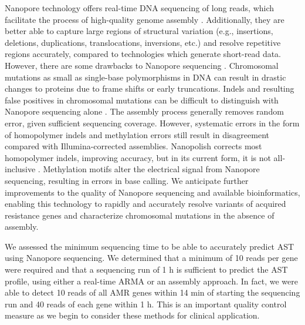Nanopore technology offers real-time DNA sequencing of long reads, which facilitate the process of high-quality genome assembly \citep{Lu2016-ru}. Additionally, they are better able to capture large regions of structural variation (e.g., insertions, deletions, duplications, translocations, inversions, etc.) and resolve repetitive regions accurately, compared to technologies which generate short-read data. However, there are some drawbacks to Nanopore sequencing \citep{Lu2016-ru}. Chromosomal mutations as small as single-base polymorphisms in DNA can result in drastic changes to proteins due to frame shifts or early truncations. Indels and resulting false positives in chromosomal mutations can be difficult to distinguish with Nanopore sequencing alone \citep{Jain2018-qp}. The assembly process generally removes random error, given sufficient sequencing coverage. However, systematic errors in the form of homopolymer indels and methylation errors still result in disagreement compared with Illumina-corrected assemblies. Nanopolish corrects most homopolymer indels, improving accuracy, but in its current form, it is not all-inclusive \citep{Loman2015-nf}. Methylation motifs alter the electrical signal from Nanopore sequencing, resulting in errors in base calling. We anticipate further improvements to the quality of Nanopore sequencing and available bioinformatics, enabling this technology to rapidly and accurately resolve variants of acquired resistance genes and characterize chromosomal mutations in the absence of assembly.

We assessed the minimum sequencing time to be able to accurately predict AST using Nanopore sequencing. We determined that a minimum of 10 reads per gene were required and that a sequencing run of 1 h is sufficient to predict the AST profile, using either a real-time ARMA or an assembly approach. In fact, we were able to detect 10 reads of all AMR genes within 14 min of starting the sequencing run and 40 reads of each gene within 1 h. This is an important quality control measure as we begin to consider these methods for clinical application.

